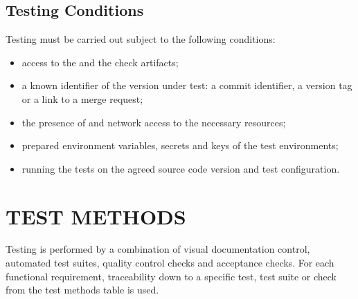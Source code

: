 \documentclass[12pt,a4paper]{extarticle}
\begin{document}
\subsection{Testing Conditions}

\begin{hseExample}
Testing must be carried out subject to the following conditions:

\begin{itemize}[leftmargin=1.25cm]
    \item access to the  and the check artifacts;
    \item a known identifier of the version under test: a commit identifier, a version tag or a link to a merge request;
    \item the presence of  and network access to the necessary resources;
    \item prepared environment variables, secrets and keys of the test environments;
    \item running the tests on the agreed source code version and test configuration.
\end{itemize}
\end{hseExample}

\clearpage

\section{TEST METHODS}
\label{sec:methods}

\begin{hseExample}
Testing is performed by a combination of visual documentation control, automated test suites, quality control checks and acceptance checks. For each functional requirement, traceability down to a specific test, test suite or check from the test methods table is used.
\end{hseExample}

\end{document}
